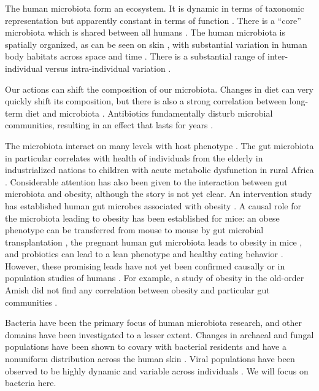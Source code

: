 \documentclass{amsart}
\begin{document}
The human microbiota form an ecosystem.
It is dynamic in terms of taxonomic representation but apparently constant in terms of function \citep{hmp2012structure}.
There is a ``core'' microbiota which is shared between all humans \citep{turnbaugh2008core}.
The human microbiota is spatially organized, as can be seen on skin \citep{grice2009topographical}, with substantial variation in human body habitats across space and time \citep{costello2009bacterial}.
There is a substantial range of inter-individual versus intra-individual variation \citep{hmp2012structure}.

Our actions can shift the composition of our microbiota.
Changes in diet can very quickly shift its composition, but there is also a strong correlation between long-term diet and microbiota \citep{li2009human,wu2011linking}.
Antibiotics fundamentally disturb microbial communities, resulting in an effect that lasts for years \citep{jernberg2007long,dethlefsen2008pervasive,jakobsson2010short,dethlefsen2011incomplete}.

The microbiota interact on many levels with host phenotype \citep[reviewed in][]{cho2012human}.
The gut microbiota in particular correlates with health of individuals from the elderly in industrialized nations \citep{claesson2012gut} to children with acute metabolic dysfunction in rural Africa \citep{smith2013gut}.
Considerable attention has also been given to the interaction between gut microbiota and obesity, although the story is not yet clear.
An intervention study has established human gut microbes associated with obesity \citep{ley2006microbial}.
A causal role for the microbiota leading to obesity has been established for mice: an obese phenotype can be transferred from mouse to mouse by gut microbial transplantation \citep{turnbaugh2006obesity}, the pregnant human gut microbiota leads to obesity in mice \citep{koren2012host}, and probiotics can lead to a lean phenotype and healthy eating behavior \citep{poutahidis2013microbial}.
However, these promising leads have not yet been confirmed causally or in population studies of humans \citep{zhao2013gut}.
For example, a study of obesity in the old-order Amish did not find any correlation between obesity and particular gut communities \citep{zupancic2012analysis}.

Bacteria have been the primary focus of human microbiota research, and other domains have been investigated to a lesser extent.
Changes in archaeal and fungal populations have been shown to covary with bacterial residents \citep{hoffmann2013archaea} and have a nonuniform distribution across the human skin \citep{Findley2013-rm}.
Viral populations have been observed to be highly dynamic and variable across individuals \citep{reyes2010viruses,minot2011human,minot2013rapid}.
We will focus on bacteria here.
\end{document}
